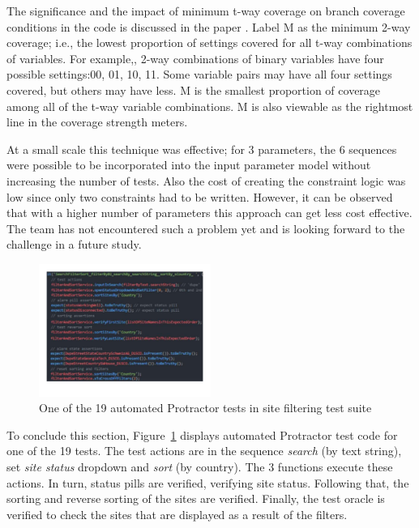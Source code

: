 \documentclass[conference]{IEEEtran}
\begin{document}
	The significance and the impact of minimum t-way coverage on branch coverage conditions in the code is discussed in the paper \cite{kuhn2016measuring}.
	Label M as the minimum 2-way coverage; i.e., the lowest proportion of settings covered for all t-way combinations of variables.
	For example,, 2-way combinations of binary variables have four possible settings:00, 01, 10, 11.
	Some variable pairs may have all four settings covered, but others may have less.
	M is the smallest proportion of coverage among all of the t-way variable combinations.
	M is also viewable as the rightmost line in the coverage strength meters.

	At a small scale this technique was effective; for 3 parameters, the 6 sequences were possible to be incorporated into the input parameter model without increasing the number of tests. 
	Also the cost of creating the constraint logic was low since only two constraints had to be written.
	However, it can be observed that with a higher number of parameters this approach can get less cost effective. 
	The team has not encountered such a problem yet and is looking forward to the challenge in a future study.
	
	\begin{figure}[!h]
		\includegraphics[width=0.50\textwidth,]{sortingTestCode.pdf}
		\caption{One of the 19 automated Protractor tests in site filtering test suite}
		\label{fig:sortingTestCode}
	\end{figure}

	To conclude this section, Figure~\ref{fig:sortingTestCode} displays automated Protractor test code for one of the 19 tests.
	The test actions are in the sequence \textit{search} (by text string), set \textit{site status} dropdown and \textit{sort} (by country). 
	The 3 functions execute these actions.
	In turn, status pills are verified, verifying site status.
	Following that, the sorting and reverse sorting of the sites are verified.
	Finally, the test oracle is verified to check the sites that are displayed as a result of the filters.
		
\end{document}
